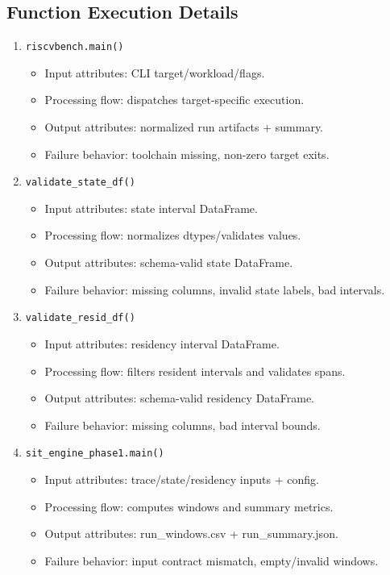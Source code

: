 \documentclass[11pt,a4paper]{article}
\begin{document}
\subsection*{Function Execution Details}
\begin{enumerate}[leftmargin=*]
  \item \texttt{riscvbench.main()}
  \begin{itemize}[leftmargin=*]
    \item Input attributes: CLI target/workload/flags.
    \item Processing flow: dispatches target-specific execution.
    \item Output attributes: normalized run artifacts + summary.
    \item Failure behavior: toolchain missing, non-zero target exits.
  \end{itemize}
  \item \texttt{validate\_state\_df()}
  \begin{itemize}[leftmargin=*]
    \item Input attributes: state interval DataFrame.
    \item Processing flow: normalizes dtypes/validates values.
    \item Output attributes: schema-valid state DataFrame.
    \item Failure behavior: missing columns, invalid state labels, bad intervals.
  \end{itemize}
  \item \texttt{validate\_resid\_df()}
  \begin{itemize}[leftmargin=*]
    \item Input attributes: residency interval DataFrame.
    \item Processing flow: filters resident intervals and validates spans.
    \item Output attributes: schema-valid residency DataFrame.
    \item Failure behavior: missing columns, bad interval bounds.
  \end{itemize}
  \item \texttt{sit\_engine\_phase1.main()}
  \begin{itemize}[leftmargin=*]
    \item Input attributes: trace/state/residency inputs + config.
    \item Processing flow: computes windows and summary metrics.
    \item Output attributes: run\_windows.csv + run\_summary.json.
    \item Failure behavior: input contract mismatch, empty/invalid windows.
  \end{itemize}
\end{enumerate}
\end{document}
